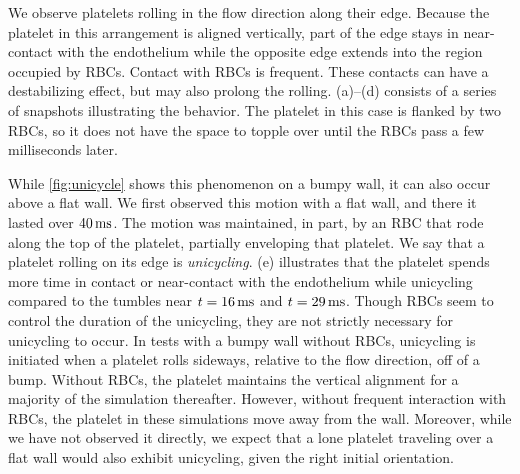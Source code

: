 We observe platelets rolling in the flow direction along their edge. Because the platelet in this arrangement is
aligned vertically, part of the edge stays in near-contact with the endothelium while the opposite edge extends
into the region occupied by RBCs.  Contact with RBCs is frequent. These contacts can have a destabilizing effect,
but may also prolong the rolling. (a)--(d) consists of a series of snapshots illustrating the
behavior. The platelet in this case is flanked by two RBCs, so it does not have the space to topple over until the
RBCs pass a few milliseconds later.

While \cref{fig:unicycle} shows this phenomenon on a bumpy wall, it can also occur above a flat wall. We first
observed this motion with a flat wall, and there it lasted over $40\ms$. The motion was maintained, in part, by an
RBC that rode along the top of the platelet, partially enveloping that platelet. We say that a platelet rolling on
its edge is \emph{unicycling}. (e) illustrates that the platelet spends more time in contact or
near-contact with the endothelium while unicycling compared to the tumbles near $t=16\ms$ and $t=29\ms$. Though
RBCs seem to control the duration of the unicycling, they are not strictly necessary for unicycling to occur. In
tests with a bumpy wall without RBCs, unicycling is initiated when a platelet rolls sideways, relative to the flow
direction, off of a bump. Without RBCs, the platelet maintains the vertical alignment for a majority of the
simulation thereafter. However, without frequent interaction with RBCs, the platelet in these simulations move
away from the wall. Moreover, while we have not observed it directly, we expect that a lone platelet traveling
over a flat wall would also exhibit unicycling, given the right initial orientation.

